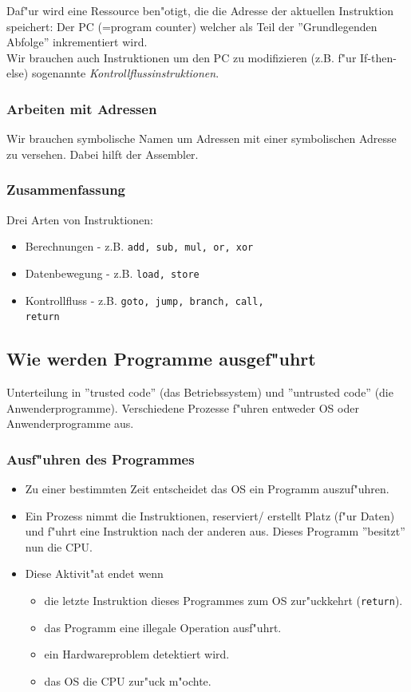 \documentclass[german, 10pt, a4paper, twocolumn]{scrartcl}
\begin{document}
Daf"ur wird eine Ressource ben"otigt, die die Adresse der aktuellen Instruktion speichert: Der PC (=program counter) welcher als Teil der ''Grundlegenden Abfolge'' inkrementiert wird.\\

Wir brauchen auch Instruktionen um den PC zu modifizieren (z.B. f"ur If-then-else) sogenannte \textit{Kontrollflussinstruktionen}.

\subsubsection{Arbeiten mit Adressen}

Wir brauchen symbolische Namen um Adressen mit einer symbolischen Adresse zu versehen. Dabei hilft der Assembler.

\subsubsection{Zusammenfassung}

Drei Arten von Instruktionen:
\begin{itemize}
	\item Berechnungen - z.B. \verb#add, sub, mul, or, xor#
	\item Datenbewegung - z.B. \verb#load, store#
	\item Kontrollfluss - z.B. \verb#goto, jump, branch, call,#\\
		\verb#return#
\end{itemize}

\subsection{Wie werden Programme ausgef"uhrt}

Unterteilung in ''trusted code'' (das Betriebssystem) und ''untrusted code'' (die Anwenderprogramme). Verschiedene Prozesse f"uhren entweder OS oder Anwenderprogramme aus.

\subsubsection{Ausf"uhren des Programmes}

\begin{itemize}
	\item Zu einer bestimmten Zeit entscheidet das OS ein Programm auszuf"uhren.
	\item Ein Prozess nimmt die Instruktionen, reserviert/ erstellt Platz (f"ur Daten) und f"uhrt eine Instruktion nach der anderen aus. Dieses Programm ''besitzt'' nun die CPU.
	\item Diese Aktivit"at endet wenn
		\begin{itemize}
			\item die letzte Instruktion dieses Programmes zum OS zur"uckkehrt (\verb#return#).
			\item das Programm eine illegale Operation ausf"uhrt.
			\item ein Hardwareproblem detektiert wird.
			\item das OS die CPU zur"uck m"ochte.
		\end{itemize}
\end{itemize}
\end{document}
